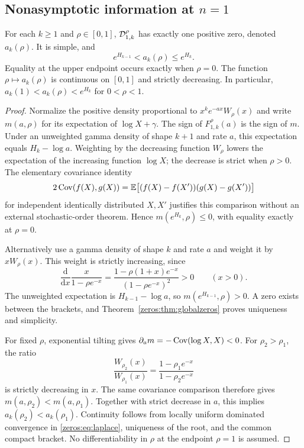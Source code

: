 \subsection{Nonasymptotic information at \texorpdfstring{$n=1$}{n=1}}
\begin{theorem}\label{zeros:thm:n1brackets}
For each $k\geq1$ and $\rho\in[0,1]$, $\mathcal D_{1,k}^{\rho}$ has exactly one positive zero, denoted $a_k(\rho)$. It is simple, and
\begin{equation}\label{zeros:eq:brackets}
 e^{H_{k-1}}<a_k(\rho)\leq e^{H_k}.
\end{equation}
Equality at the upper endpoint occurs exactly when $\rho=0$. The function $\rho\mapsto a_k(\rho)$ is continuous on $[0,1]$ and strictly decreasing. In particular, $a_k(1)<a_k(\rho)<e^{H_k}$ for $0<\rho<1$.
\end{theorem}
\begin{proof}
Normalize the positive density proportional to $x^ke^{-ax}W_\rho(x)$ and write $m(a,\rho)$ for its expectation of $\log X+\gamma$. The sign of $F_{1,k}^{\rho}(a)$ is the sign of $m$. Under an unweighted gamma density of shape $k+1$ and rate $a$, this expectation equals $H_k-\log a$. Weighting by the decreasing function $W_\rho$ lowers the expectation of the increasing function $\log X$; the decrease is strict when $\rho>0$. The elementary covariance identity
\[
 2\operatorname{Cov}(f(X),g(X))
   =\mathbb E\bigl[(f(X)-f(X'))(g(X)-g(X'))\bigr]
\]
for independent identically distributed $X,X'$ justifies this comparison without an external stochastic-order theorem. Hence $m(e^{H_k},\rho)\leq0$, with equality exactly at $\rho=0$.

Alternatively use a gamma density of shape $k$ and rate $a$ and weight it by $xW_\rho(x)$. This weight is strictly increasing, since
\[
 \frac{\mathrm d}{\mathrm dx}\frac{x}{1-\rho e^{-x}}
     =\frac{1-\rho(1+x)e^{-x}}{(1-\rho e^{-x})^2}>0\qquad(x>0).
\]
The unweighted expectation is $H_{k-1}-\log a$, so $m(e^{H_{k-1}},\rho)>0$. A zero exists between the brackets, and Theorem~\ref{zeros:thm:globalzeros} proves uniqueness and simplicity.

For fixed $\rho$, exponential tilting gives
$\partial_a m=-\operatorname{Cov}(\log X,X)<0$. For $\rho_2>\rho_1$, the ratio
\[
 \frac{W_{\rho_2}(x)}{W_{\rho_1}(x)}
    =\frac{1-\rho_1e^{-x}}{1-\rho_2e^{-x}}
\]
is strictly decreasing in $x$. The same covariance comparison therefore gives $m(a,\rho_2)<m(a,\rho_1)$. Together with strict decrease in $a$, this implies $a_k(\rho_2)<a_k(\rho_1)$. Continuity follows from locally uniform dominated convergence in \eqref{zeros:eq:laplace}, uniqueness of the root, and the common compact bracket. No differentiability in $\rho$ at the endpoint $\rho=1$ is assumed.
\end{proof}

